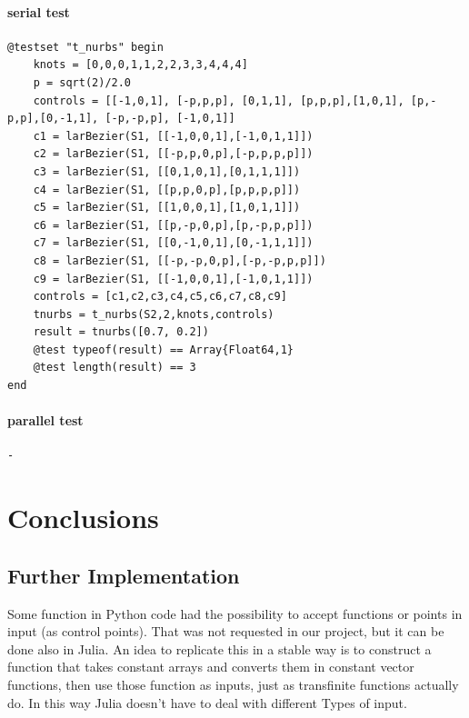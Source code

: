 \documentclass[a4paper,11pt]{article}
\begin{document}
\paragraph{serial test}
\begin{verbatim}
@testset "t_nurbs" begin
    knots = [0,0,0,1,1,2,2,3,3,4,4,4]
    p = sqrt(2)/2.0
    controls = [[-1,0,1], [-p,p,p], [0,1,1], [p,p,p],[1,0,1], [p,-p,p],[0,-1,1], [-p,-p,p], [-1,0,1]]
    c1 = larBezier(S1, [[-1,0,0,1],[-1,0,1,1]])
    c2 = larBezier(S1, [[-p,p,0,p],[-p,p,p,p]])
    c3 = larBezier(S1, [[0,1,0,1],[0,1,1,1]])
    c4 = larBezier(S1, [[p,p,0,p],[p,p,p,p]])
    c5 = larBezier(S1, [[1,0,0,1],[1,0,1,1]])
    c6 = larBezier(S1, [[p,-p,0,p],[p,-p,p,p]])
    c7 = larBezier(S1, [[0,-1,0,1],[0,-1,1,1]])
    c8 = larBezier(S1, [[-p,-p,0,p],[-p,-p,p,p]])
    c9 = larBezier(S1, [[-1,0,0,1],[-1,0,1,1]])
    controls = [c1,c2,c3,c4,c5,c6,c7,c8,c9]         
    tnurbs = t_nurbs(S2,2,knots,controls)
    result = tnurbs([0.7, 0.2])
    @test typeof(result) == Array{Float64,1}
    @test length(result) == 3
end
\end{verbatim}

\paragraph{parallel test}
\begin{verbatim}
-
\end{verbatim}

\section{Conclusions}

\subsection{Further Implementation}
\label{sec: fi}
Some function in Python code had the possibility to accept functions or points in input (as control points). That was not requested in our project, but it can be done also in Julia. An idea to replicate this in a stable way is to construct a function that takes constant arrays and converts them in constant vector functions, then use those function as inputs, just as transfinite functions actually do. In this way Julia doesn't have to deal with different Types of input.
\end{document}
